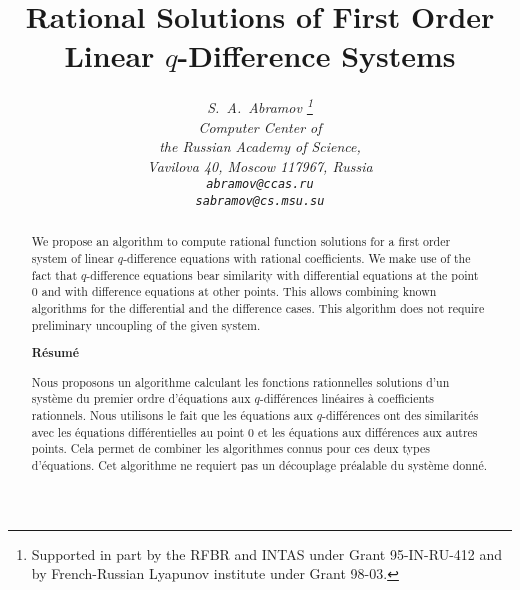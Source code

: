 \newcommand {\cRp} {{\cal R}_q}
\newcommand {\ord}{\mathop{\rm ord}}
\newcommand {\lcm}{\mathop{\rm lcm}}
\newcommand {\lc}{\mathop{\rm lc}}
\newcommand {\qed}{\hfill$\Box$\par\medskip}
\newtheorem{Theorem}{Theorem}
\newtheorem{Lemma}{Lemma}
\def\o{\circ}
\def\wt{\widetilde}
\title{\Large\bf
Rational Solutions of
First Order Linear $q$-Difference Systems
}

\author{\large\sl S.~A.~Abramov
\thanks{Supported in part by
the RFBR and INTAS under Grant 95-IN-RU-412
and by French-Russian Lyapunov institute
under Grant 98-03.}
\\
\normalsize Computer Center of\\
\normalsize the Russian Academy of Science, \\
\normalsize Vavilova 40, Moscow 117967, Russia \\
\normalsize {\tt abramov@ccas.ru}\\
\normalsize {\tt sabramov@cs.msu.su}
}



\date{}

\maketitle

\begin{abstract}
We propose an algorithm to compute rational
function solutions for a first order system
of linear $q$-difference equations
with rational coefficients.
We make use of the fact
that $q$-difference equations bear similarity with
differential equations at the point 0 and with difference equations
at other points. This allows combining known algorithms for the
differential and the difference cases.
This algorithm does not require
preliminary uncoupling of the given system.
\begin{center}
\bf R\'esum\'e
\end{center}

Nous proposons un algorithme calculant les fonctions rationnelles
solutions d'un syst\`eme  du premier ordre d'\'equations aux
$q$-diff\'erences lin\'eaires \`a coefficients rationnels. Nous
utilisons le fait que les \'equations aux $q$-diff\'erences ont des
similarit\'es avec les \'equations diff\'erentielles au point 0 et
les \'equations aux diff\'erences aux autres points. Cela permet
de combiner les algorithmes connus pour ces deux types d'\'equations.
Cet algorithme ne requiert pas un d\'ecouplage
 pr\'ealable du
syst\`eme donn\'e.
\end{abstract}
